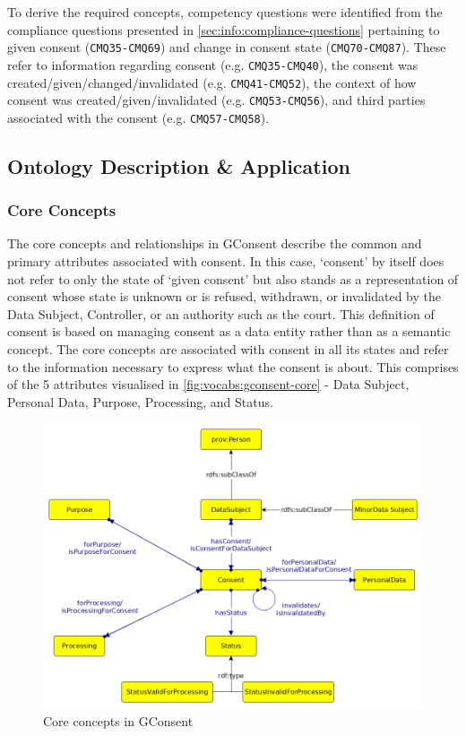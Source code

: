To derive the required concepts, competency questions were identified from the compliance questions presented in \autoref{sec:info:compliance-questions} pertaining to given consent (\texttt{CMQ35-CMQ69}) and change in consent state (\texttt{CMQ70-CMQ87}).
These refer to information regarding consent (e.g. \texttt{CMQ35-CMQ40}), the consent was created/given/changed/invalidated (e.g. \texttt{CMQ41-CMQ52}), the context of how consent was created/given/invalidated (e.g. \texttt{CMQ53-CMQ56}), and third parties associated with the consent (e.g. \texttt{CMQ57-CMQ58}).

\subsection{Ontology Description \& Application}
\subsubsection{Core Concepts}
The core concepts and relationships in GConsent describe the common and primary attributes associated with consent.
In this case, `consent' by itself does not refer to only the state of `given consent' but also stands as a representation of consent whose state is unknown or is refused, withdrawn, or invalidated by the Data Subject, Controller, or an authority such as the court. This definition of consent is based on managing consent as a data entity rather than as a semantic concept. 
The core concepts are associated with consent in all its states and refer to the information necessary to express what the consent is about. This comprises of the 5 attributes visualised in \autoref{fig:vocabs:gconsent-core} - Data Subject, Personal Data, Purpose, Processing, and Status.
\begin{figure}[htbp]
    \centering
    \includegraphics[width=0.8\linewidth]{img/gconsent_core.png}
    \caption{Core concepts in GConsent \cite{pandit_gconsent_2019}}
    \label{fig:vocabs:gconsent-core}
\end{figure}

